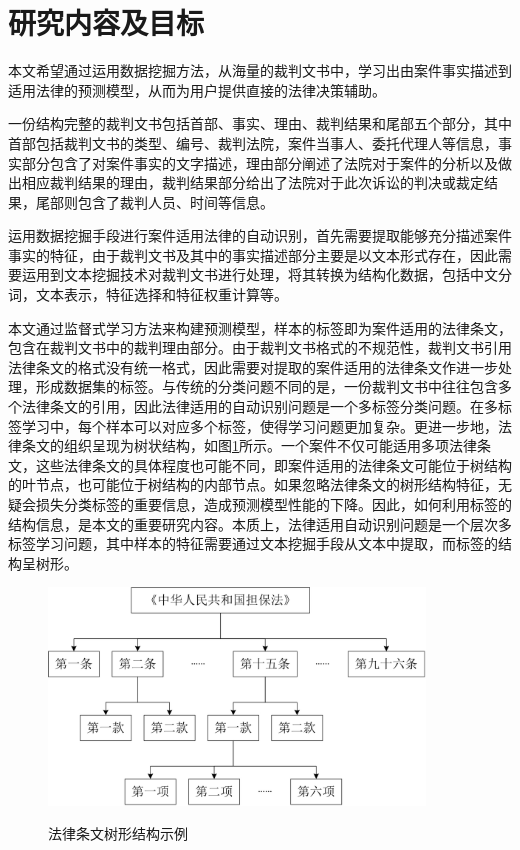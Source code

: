     \section{研究内容及目标}
    本文希望通过运用数据挖掘方法，从海量的裁判文书中，学习出由案件事实描述到适用法律的预测模型，从而为用户提供直接的法律决策辅助。

    一份结构完整的裁判文书包括首部、事实、理由、裁判结果和尾部五个部分，其中首部包括裁判文书的类型、编号、裁判法院，案件当事人、委托代理人等信息，事实部分包含了对案件事实的文字描述，理由部分阐述了法院对于案件的分析以及做出相应裁判结果的理由，裁判结果部分给出了法院对于此次诉讼的判决或裁定结果，尾部则包含了裁判人员、时间等信息。

    运用数据挖掘手段进行案件适用法律的自动识别，首先需要提取能够充分描述案件事实的特征，由于裁判文书及其中的事实描述部分主要是以文本形式存在，因此需要运用到文本挖掘技术对裁判文书进行处理，将其转换为结构化数据，包括中文分词，文本表示，特征选择和特征权重计算等。

    本文通过监督式学习方法来构建预测模型，样本的标签即为案件适用的法律条文，包含在裁判文书中的裁判理由部分。由于裁判文书格式的不规范性，裁判文书引用法律条文的格式没有统一格式，因此需要对提取的案件适用的法律条文作进一步处理，形成数据集的标签。与传统的分类问题不同的是，一份裁判文书中往往包含多个法律条文的引用，因此法律适用的自动识别问题是一个多标签分类问题\cite{tsoumakas2006multi}。在多标签学习中，每个样本可以对应多个标签，使得学习问题更加复杂。更进一步地，法律条文的组织呈现为树状结构，如图\ref{Figure1}所示。一个案件不仅可能适用多项法律条文，这些法律条文的具体程度也可能不同，即案件适用的法律条文可能位于树结构的叶节点，也可能位于树结构的内部节点。如果忽略法律条文的树形结构特征，无疑会损失分类标签的重要信息，造成预测模型性能的下降。因此，如何利用标签的结构信息，是本文的重要研究内容。本质上，法律适用自动识别问题是一个层次多标签学习问题\cite{barutcuoglu2006hierarchical}，其中样本的特征需要通过文本挖掘手段从文本中提取，而标签的结构呈树形。

    \begin{figure}[ht]
        \centering
        \includegraphics[width=10cm]{figures/Figure1}\\
        \caption{法律条文树形结构示例}\label{Figure1}
    \end{figure}

